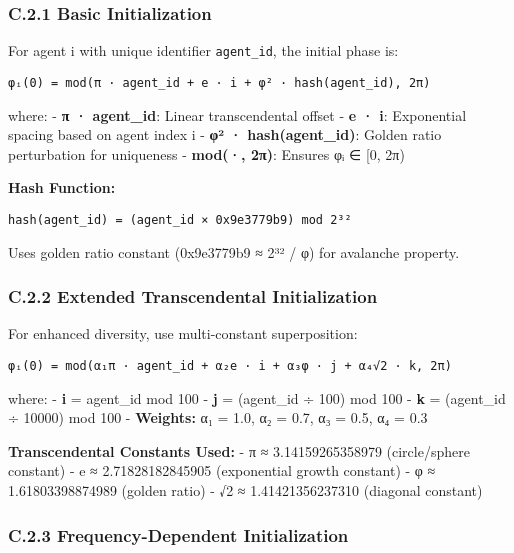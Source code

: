 \documentclass[
]{article}
\begin{document}
\subsubsection{C.2.1 Basic
Initialization}\label{c.2.1-basic-initialization}

For agent i with unique identifier \texttt{agent\_id}, the initial phase
is:

\begin{verbatim}
φᵢ(0) = mod(π · agent_id + e · i + φ² · hash(agent_id), 2π)
\end{verbatim}

where: - \textbf{π · agent\_id}: Linear transcendental offset -
\textbf{e · i}: Exponential spacing based on agent index i - \textbf{φ²
· hash(agent\_id)}: Golden ratio perturbation for uniqueness -
\textbf{mod(·, 2π)}: Ensures φᵢ ∈ {[}0, 2π)

\textbf{Hash Function:}

\begin{verbatim}
hash(agent_id) = (agent_id × 0x9e3779b9) mod 2³²
\end{verbatim}

Uses golden ratio constant (0x9e3779b9 ≈ 2³² / φ) for avalanche
property.

\subsubsection{C.2.2 Extended Transcendental
Initialization}\label{c.2.2-extended-transcendental-initialization}

For enhanced diversity, use multi-constant superposition:

\begin{verbatim}
φᵢ(0) = mod(α₁π · agent_id + α₂e · i + α₃φ · j + α₄√2 · k, 2π)
\end{verbatim}

where: - \textbf{i} = agent\_id mod 100 - \textbf{j} = (agent\_id ÷ 100)
mod 100 - \textbf{k} = (agent\_id ÷ 10000) mod 100 - \textbf{Weights:}
α₁ = 1.0, α₂ = 0.7, α₃ = 0.5, α₄ = 0.3

\textbf{Transcendental Constants Used:} - π ≈ 3.14159265358979
(circle/sphere constant) - e ≈ 2.71828182845905 (exponential growth
constant) - φ ≈ 1.61803398874989 (golden ratio) - √2 ≈ 1.41421356237310
(diagonal constant)

\subsubsection{C.2.3 Frequency-Dependent
Initialization}\label{c.2.3-frequency-dependent-initialization}
\end{document}
